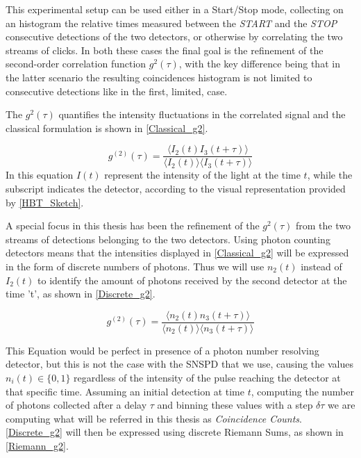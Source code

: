 This experimental setup can be used either in a Start/Stop mode, collecting on an histogram the relative times measured between the \emph{START} and the \emph{STOP} consecutive detections of the two detectors, or otherwise by correlating the two streams of clicks. %
In both these cases the final goal is the refinement of the second-order correlation function $g^{2}(\tau)$, with the key difference being that in the latter scenario the resulting coincidences histogram is not limited to consecutive detections like in the first, limited, case.

The $g^{2}(\tau)$ quantifies the intensity fluctuations in the correlated signal and the classical formulation is shown in \autoref{Classical_g2}.

\begin{equation}
g^{(2)}(\tau) = \frac{\langle I_2(t) I_3(t + \tau) \rangle}{\langle I_2(t) \rangle \langle I_3(t + \tau) \rangle}
\label{Classical_g2}
\end{equation}
In this equation $I(t)$ represent the intensity of the light at the time $t$, while the subscript indicates the detector, according to the visual representation  provided by \autoref{HBT_Sketch}.

A special focus in this thesis has been the refinement of the $g^{2}(\tau)$ from the two streams of detections belonging to the two detectors.
Using photon counting detectors means that the intensities displayed in \autoref{Classical_g2} will be expressed in the form of discrete numbers of photons. Thus we will use $n_{2}(t)$ instead of $I_{2}(t)$ to identify the amount of photons received by the second detector at the time 't', as shown in \autoref{Discrete_g2}.

\begin{equation}
g^{(2)}(\tau) = \frac{\langle n_2(t) n_3(t + \tau) \rangle}{\langle n_2(t) \rangle \langle n_3(t + \tau) \rangle}
\label{Discrete_g2}
\end{equation}

This Equation would be perfect in presence of a photon number resolving detector, but this is not the case with the SNSPD that we use, causing the values $n_i(t) \in \{0,1\}$ regardless of the intensity of the pulse reaching the detector at that specific time.
Assuming an initial detection at time $t$, computing the number of photons collected after a delay $\tau$ and binning these values with a step $\delta \tau$ we are computing what will be referred in this thesis as \emph{Coincidence Counts}.
\autoref{Discrete_g2} will then be expressed using discrete Riemann Sums, as shown in \autoref{Riemann_g2}.

